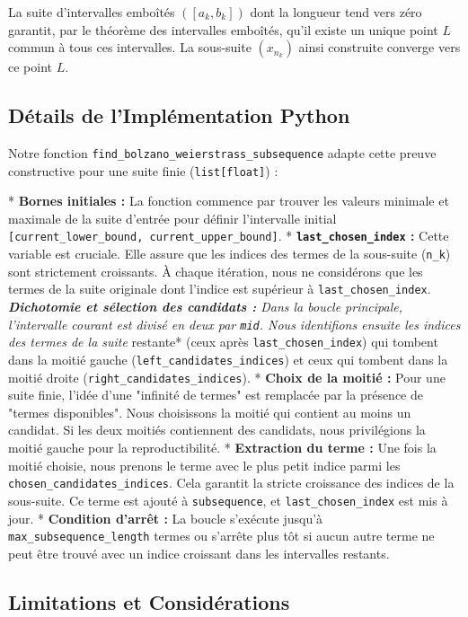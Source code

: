 \documentclass{report}
\begin{document}
La suite d'intervalles emboîtés $([a_k, b_k])$ dont la longueur tend vers zéro garantit, par le théorème des intervalles emboîtés, qu'il existe un unique point $L$ commun à tous ces intervalles. La sous-suite $(x_{n_k})$ ainsi construite converge vers ce point $L$.

\subsection*{Détails de l'Implémentation Python}

Notre fonction \texttt{find\_bolzano\_weierstrass\_subsequence} adapte cette preuve constructive pour une suite finie (\texttt{list[float]}) :

*   \textbf{Bornes initiales :} La fonction commence par trouver les valeurs minimale et maximale de la suite d'entrée pour définir l'intervalle initial \texttt{[current\_lower\_bound, current\_upper\_bound]}.
*   \textbf{\texttt{last\_chosen\_index} :} Cette variable est cruciale. Elle assure que les indices des termes de la sous-suite (\texttt{n\_k}) sont strictement croissants. À chaque itération, nous ne considérons que les termes de la suite originale dont l'indice est supérieur à \texttt{last\_chosen\_index}.
\textit{   \textbf{Dichotomie et sélection des candidats :} Dans la boucle principale, l'intervalle courant est divisé en deux par \texttt{mid}. Nous identifions ensuite les indices des termes de la suite }restante* (ceux après \texttt{last\_chosen\_index}) qui tombent dans la moitié gauche (\texttt{left\_candidates\_indices}) et ceux qui tombent dans la moitié droite (\texttt{right\_candidates\_indices}).
*   \textbf{Choix de la moitié :} Pour une suite finie, l'idée d'une "infinité de termes" est remplacée par la présence de "termes disponibles". Nous choisissons la moitié qui contient au moins un candidat. Si les deux moitiés contiennent des candidats, nous privilégions la moitié gauche pour la reproductibilité.
*   \textbf{Extraction du terme :} Une fois la moitié choisie, nous prenons le terme avec le plus petit indice parmi les \texttt{chosen\_candidates\_indices}. Cela garantit la stricte croissance des indices de la sous-suite. Ce terme est ajouté à \texttt{subsequence}, et \texttt{last\_chosen\_index} est mis à jour.
*   \textbf{Condition d'arrêt :} La boucle s'exécute jusqu'à \texttt{max\_subsequence\_length} termes ou s'arrête plus tôt si aucun autre terme ne peut être trouvé avec un indice croissant dans les intervalles restants.

\subsection*{Limitations et Considérations}
\end{document}
